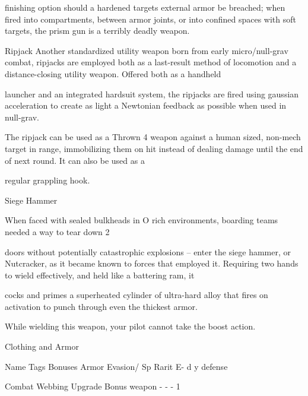 finishing option should a hardened targets external armor be breached; when fired into compartments,  
between armor joints, or into confined spaces with soft targets, the prism gun is a terribly deadly weapon.   

Ripjack  
Another standardized utility weapon born from early micro/null-grav combat, ripjacks are employed both as  
a last-result method of locomotion and a distance-closing utility weapon. Offered both as a handheld  

launcher and an integrated hardsuit system, the ripjacks are fired using gaussian acceleration to create as  
light a Newtonian feedback as possible when used in null-grav.     

                                                                                                                       


The ripjack can be used as a Thrown 4 weapon against a human sized, non-mech target in range,  
immobilizing them on hit instead of dealing damage until the end of next round. It can also be used as a  

regular grappling hook.
 

Siege Hammer  

When faced with sealed bulkheads in O   rich environments, boarding teams needed a way to tear down  
                                             2  

doors without potentially catastrophic explosions -- enter the siege hammer, or Nutcracker, as it became  
known to forces that employed it. Requiring two hands to wield effectively, and held like a battering ram, it  

cocks and primes a superheated cylinder of ultra-hard alloy that fires on activation to punch through even  
the thickest armor.  

While wielding this weapon, your pilot cannot take the boost action.
 

                                                 Clothing and Armor  

 Name                                  Tags          Bonuses                        Armor     Evasion/      Sp     Rarit 
                                                                                              E-            d      y 
                                                                                              defense 

 Combat Webbing                        Upgrade       Bonus weapon                    -        -             -      1 


